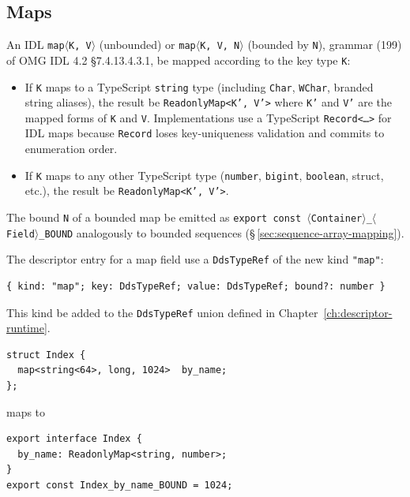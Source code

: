 \documentclass{../styles/zerodds-vendor-spec}
\begin{document}
\subsection{Maps}\label{sec:map-mapping}

An IDL \texttt{map$\langle$K,\,V$\rangle$} (unbounded) or
\texttt{map$\langle$K,\,V,\,N$\rangle$} (bounded by \texttt{N}),
grammar (199) of OMG IDL 4.2 §7.4.13.4.3.1,  be
mapped according to the key type \texttt{K}:

\begin{itemize}[noitemsep]
  \item If \texttt{K} maps to a TypeScript \texttt{string} type
        (including \texttt{Char}, \texttt{WChar}, branded string
        aliases), the result  be
        \texttt{ReadonlyMap<K',\,V'>} where \texttt{K'} and
        \texttt{V'} are the mapped forms of \texttt{K} and
        \texttt{V}. Implementations  use a
        TypeScript \texttt{Record<\ldots>} for IDL maps because
        \texttt{Record} loses key-uniqueness validation and
        commits to enumeration order.
  \item If \texttt{K} maps to any other TypeScript type
        (\texttt{number}, \texttt{bigint}, \texttt{boolean},
        struct, etc.), the result  be
        \texttt{ReadonlyMap<K',\,V'>}.
\end{itemize}

The bound \texttt{N} of a bounded map  be emitted as
\texttt{export const $\langle$Container$\rangle$\_$\langle$Field$\rangle$\_BOUND}
analogously to bounded sequences
(\S\,\ref{sec:sequence-array-mapping}).

The descriptor entry for a map field  use a
\texttt{DdsTypeRef} of the new kind \texttt{"map"}:

\begin{lstlisting}
{ kind: "map"; key: DdsTypeRef; value: DdsTypeRef; bound?: number }
\end{lstlisting}

This kind  be added to the \texttt{DdsTypeRef} union
defined in Chapter~\ref{ch:descriptor-runtime}.

\begin{specexample}
\begin{lstlisting}
struct Index {
  map<string<64>, long, 1024>  by_name;
};
\end{lstlisting}
maps to
\begin{lstlisting}
export interface Index {
  by_name: ReadonlyMap<string, number>;
}
export const Index_by_name_BOUND = 1024;
\end{lstlisting}
\end{specexample}
\end{document}
